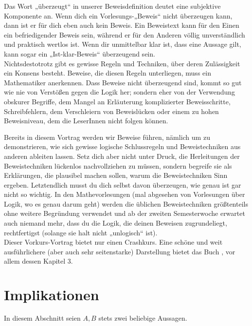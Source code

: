 \begin{bem}
Das Wort „überzeugt“ in unserer Beweisdefinition deutet eine subjektive Komponente an. Wenn dich ein Vorlesungs-„Beweis“ nicht überzeugen kann, dann ist er für dich eben auch kein Beweis. Ein Beweistext kann für den Einen ein befriedigender Beweis sein, während er für den Anderen völlig unverständlich und praktisch wertlos ist. Wenn dir unmittelbar klar ist, dass eine Aussage gilt, kann sogar ein „Ist-klar-Beweis“ überzeugend sein. \\[0.5em]
Nichtsdestotrotz gibt es gewisse Regeln und Techniken, über deren Zulässigkeit ein Konsens besteht. Beweise, die diesen Regeln unterliegen, muss ein Mathematiker anerkennen. Dass Beweise nicht überzeugend sind, kommt so gut wie nie von Verstößen gegen die Logik her; sondern eher von der Verwendung obskurer Begriffe, dem Mangel an Erläuterung komplizierter Beweisschritte, Schreibfehlern, dem Verschleiern von Beweislücken oder einem zu hohen Beweisniveau, dem die LeserInnen nicht folgen können.
\end{bem}


Bereits in diesem Vortrag werden wir Beweise führen, nämlich um zu demonstrieren, wie sich gewisse logische Schlussregeln und Beweistechniken aus anderen ableiten lassen. Setz dich aber nicht unter Druck, die Herleitungen der Beweistechniken lückenlos nachvollziehen zu müssen, sondern begreife sie als Erklärungen, die plausibel machen sollen, warum die Beweistechniken Sinn ergeben. Letztendlich musst du dich selbst davon überzeugen, wie genau ist gar nicht so wichtig. In den Mathevorlesungen (mal abgesehen von Vorlesungen über Logik, wo es genau darum geht) werden die üblichen Beweistechniken größtenteils ohne weitere Begründung verwendet und ab der zweiten Semesterwoche erwartet auch niemand mehr, dass du die Logik, die deinen Beweisen zugrundeliegt, rechtfertigst (solange sie halt nicht „unlogisch“ ist). \\

Dieser Vorkurs-Vortrag bietet nur einen Crashkurs. Eine schöne und weit ausführlichere (aber auch sehr seitenstarke) Darstellung bietet das Buch \citet{Vel06}, vor allem dessen Kapitel 3.




\section{Implikationen}
In diesem Abschnitt seien $A,B$ stets zwei beliebige Aussagen.

